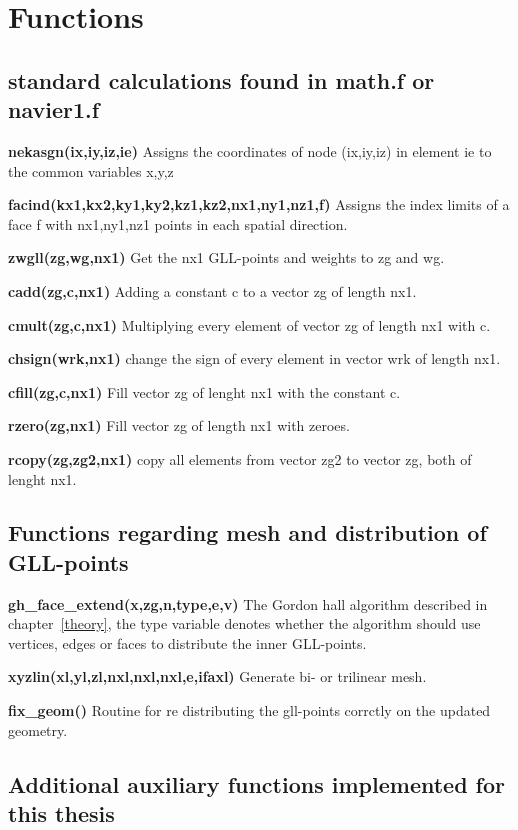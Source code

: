 \section{Functions}

\subsection{standard calculations found in math.f or navier1.f}

\textbf{nekasgn(ix,iy,iz,ie) } Assigns the coordinates of node 
    (ix,iy,iz) in element ie to the common variables x,y,z 

\textbf{facind(kx1,kx2,ky1,ky2,kz1,kz2,nx1,ny1,nz1,f) } 
Assigns the index limits of a face f with nx1,ny1,nz1 points in each spatial direction.

\textbf{zwgll(zg,wg,nx1)} Get the nx1 GLL-points and weights to zg and wg.

\textbf{cadd(zg,c,nx1)} Adding a constant c to a vector zg of length nx1.

\textbf{cmult(zg,c,nx1)} Multiplying every element of vector zg of length nx1 with c.

\textbf{chsign(wrk,nx1)} change the sign of every element in vector wrk of length nx1.

\textbf{cfill(zg,c,nx1)}  Fill vector zg of lenght nx1 with the constant c.

\textbf{rzero(zg,nx1) } Fill vector zg of length nx1 with zeroes.

\textbf{rcopy(zg,zg2,nx1) } copy all elements from vector zg2 to vector zg, both of lenght nx1.

\subsection{Functions regarding mesh and distribution of GLL-points}

\textbf{gh\_face\_extend(x,zg,n,type,e,v)}  The Gordon hall algorithm described in chapter~\ref{theory}, the type variable denotes whether the 
algorithm should use vertices, edges or faces to distribute the inner GLL-points. 

\textbf{xyzlin(xl,yl,zl,nxl,nxl,nxl,e,ifaxl)} Generate bi- or trilinear mesh.

\textbf{fix\_geom()} Routine for re distributing the gll-points corrctly on the updated geometry.

\subsection{Additional auxiliary functions implemented for this thesis}

